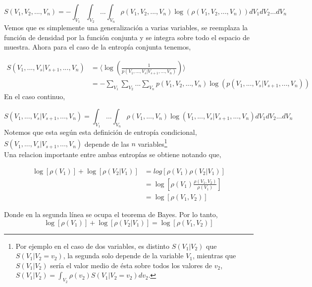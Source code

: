 \documentclass[executivepaper,12pt]{article}
\numberwithin{equation}{section}
\begin{document}
\begin{equation*}
	S(V_1,V_2,...,V_n)=-\int_{V_1}\int_{V_2}...\int_{V_n} \rho(V_1,V_2,...,V_n)\log(\rho(V_1,V_2,...,V_n)) dV_1 dV_2...dV_n
\end{equation*}
Vemos que es simplemente una generalización a varias variables, se reemplaza la función de densidad por la función conjunta y se integra sobre todo el espacio de muestra. Ahora para el caso de la entropía conjunta tenemos, 

\begin{align*}
	S(V_1,...,V_s\rvert V_{s+1},...,V_n)&=\langle \log\left(\frac{1}{p(V_1,...,V_s\rvert V_{s+1},...,V_n)}\right) \rangle \\
	&=-\sum_{V_1} \sum_{V_2}...\sum_{V_n} p(V_1,V_2,...,V_n)\log (p(V_1,...,V_s\rvert V_{s+1},...,V_n)) 
\end{align*}
En el caso continuo,

\begin{equation*}
	S(V_1,...,V_s\rvert V_{s+1},...,V_n)=\int_{V_1}...\int_{V_n}\rho(V_1,...,V_n)\log\left(V_1,...,V_s\rvert V_{s+1},...,V_n\right) dV_1 dV_2...dV_n
\end{equation*}
Notemos que esta según esta definición de entropía condicional, $S(V_1,...,V_s\rvert V_{s+1},...,V_n)$ depende de las $n$ variables\footnote{Por ejemplo en el caso de dos variables, es distinto $S(V_1 \rvert V_2)$ que $S(V_1\rvert V_2=v_2)$, la segunda solo depende de la variable $V_1$, mientras que $S(V_1\rvert V_2)$ sería el valor medio de ésta sobre todos los valores de $v_2$, $S(V_1\rvert V_2)=\int_{V_2} \rho(v_2) S(V_1\rvert V_2=v_2) dv_2$.}\\

Una relacion importante entre ambas entropías se obtiene notando que,

\begin{align*}
	\log\left[\rho(V_1)\right] + \log\left[\rho(V_2\rvert V_1)\right]&=log\left[\rho(V_1)\rho(V_2\rvert V_1)\right]\\
	&=\log\left[\rho(V_1)\frac{\rho(V_1,V_2)}{\rho(V_1)}\right]\\
	&=\log\left[\rho(V_1,V_2)\right]
\end{align*}

Donde en la segunda línea se ocupa el teorema de Bayes. Por lo tanto,
\begin{equation*}
	\log\left[\rho(V_1)\right] + \log\left[\rho(V_2\rvert V_1)\right]=\log\left[\rho(V_1,V_2)\right]
\end{equation*}
\end{document}
